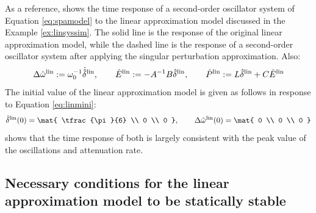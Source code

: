 \documentclass[tombow,dvipdfmx]{corona-a5-1.1}
\begin{document}


\begin{例}
As a reference,  shows the time response of a second-order oscillator system of Equation \ref{eq:spamodel} to the linear approximation model discussed in the Example \ref{ex:linsyssim}.
The solid line is the response of the original linear approximation model, while the dashed line is the response of a second-order oscillator system after applying the singular perturbation approximation.
Also:
\[
\Delta \hat{\omega}^{\rm lin}:=\omega_0^{-1} \dot{\hat{\delta}}^{\rm lin},\qquad
\hat{E}^{\rm lin}:=-A^{-1}B\hat{\delta}^{\rm lin},\qquad
\hat{P}^{\rm lin}:= L \hat{\delta}^{\rm lin} + C \hat{E}^{\rm lin}
\]
The initial value of the linear approximation model is given as follows in response to Equation \ref{eq:linmini}:
\[
\hat{\delta}^{\rm lin}(0)
 =
\mat{
\tfrac{\pi}{6} \\
0 \\
0
},\qquad
\Delta \hat{\omega}^{\rm lin}(0)
 =
\mat{
0 \\
0 \\
0
}
\]
 shows that the time response of both is largely consistent with the peak value of the oscillations and attenuation rate.
\end{例}

\subsection{Necessary conditions for the linear approximation model to be statically stable\advanced}\label{sec:nesconsta}
\end{document}
